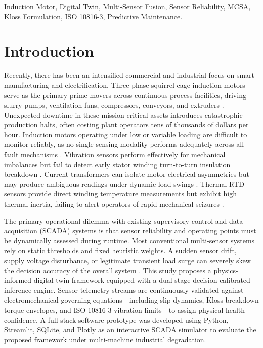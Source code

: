 \documentclass[conference]{IEEEtran}
\begin{document}
\begin{IEEEkeywords}
Induction Motor, Digital Twin, Multi-Sensor Fusion, Sensor Reliability, MCSA, Kloss Formulation, ISO 10816-3, Predictive Maintenance.
\end{IEEEkeywords}

\section{Introduction}
Recently, there has been an intensified commercial and industrial focus on smart manufacturing and electrification. Three-phase squirrel-cage induction motors serve as the primary prime movers across continuous-process facilities, driving slurry pumps, ventilation fans, compressors, conveyors, and extruders \cite{ref1}. Unexpected downtime in these mission-critical assets introduces catastrophic production halts, often costing plant operators tens of thousands of dollars per hour. Induction motors operating under low or variable loading are difficult to monitor reliably, as no single sensing modality performs adequately across all fault mechanisms \cite{ref2}. Vibration sensors perform effectively for mechanical imbalances but fail to detect early stator winding turn-to-turn insulation breakdown \cite{ref3}. Current transformers can isolate motor electrical asymmetries but may produce ambiguous readings under dynamic load swings \cite{ref4}. Thermal RTD sensors provide direct winding temperature measurements but exhibit high thermal inertia, failing to alert operators of rapid mechanical seizures \cite{ref5}.

The primary operational dilemma with existing supervisory control and data acquisition (SCADA) systems is that sensor reliability and operating points must be dynamically assessed during runtime. Most conventional multi-sensor systems rely on static thresholds and fixed heuristic weights. A sudden sensor drift, supply voltage disturbance, or legitimate transient load surge can severely skew the decision accuracy of the overall system \cite{ref7}. This study proposes a physics-informed digital twin framework equipped with a dual-stage decision-calibrated inference engine. Sensor telemetry streams are continuously validated against electromechanical governing equations---including slip dynamics, Kloss breakdown torque envelopes, and ISO 10816-3 vibration limits---to assign physical health confidence. A full-stack software prototype was developed using Python, Streamlit, SQLite, and Plotly as an interactive SCADA simulator to evaluate the proposed framework under multi-machine industrial degradation.
\end{document}

